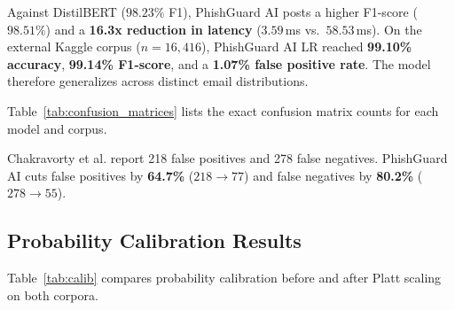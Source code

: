 \documentclass[conference]{IEEEtran}
\begin{document}
Against DistilBERT ($98.23\%$ F1), PhishGuard AI posts a higher F1-score ($98.51\%$) and a \textbf{16.3x reduction in latency} ($3.59$\,ms vs.\ $58.53$\,ms). On the external Kaggle corpus ($n=16{,}416$), PhishGuard AI LR reached \textbf{99.10\% accuracy}, \textbf{99.14\% F1-score}, and a \textbf{1.07\% false positive rate}. The model therefore generalizes across distinct email distributions.

Table~\ref{tab:confusion_matrices} lists the exact confusion matrix counts for each model and corpus.

\begin{table}[!t]
\caption{Confusion Matrix Breakdown Across Models and Corpora.}
\label{tab:confusion_matrices}
\centering\footnotesize
{}
\end{table}

Chakravorty et al. report 218 false positives and 278 false negatives. PhishGuard AI cuts false positives by \textbf{64.7\%} ($218 \rightarrow 77$) and false negatives by \textbf{80.2\%} ($278 \rightarrow 55$).

\subsection{Probability Calibration Results}
Table~\ref{tab:calib} compares probability calibration before and after Platt scaling on both corpora.
\end{document}
